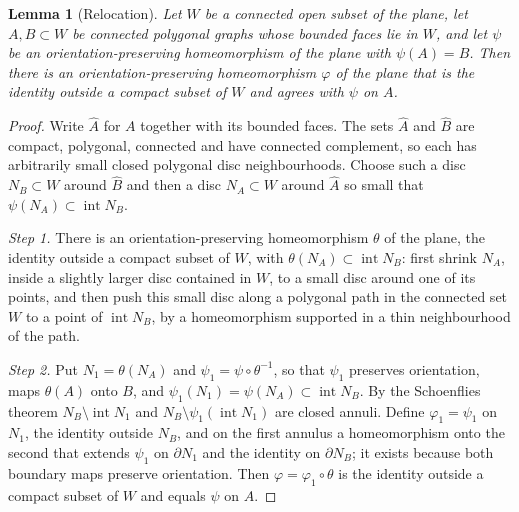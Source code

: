 \documentclass[11pt,a4paper]{article}
\newtheorem{lemma}[theorem]{Lemma}
\theoremstyle{definition}
\theoremstyle{remark}
\begin{document}
\begin{lemma}[Relocation]\label{lem:relocate}
Let $W$ be a connected open subset of the plane, let $A,B\subset W$ be
connected polygonal graphs whose bounded faces lie in $W$, and let $\psi$ be
an orientation-preserving homeomorphism of the plane with $\psi(A)=B$. Then
there is an orientation-preserving homeomorphism $\varphi$ of the plane that
is the identity outside a compact subset of $W$ and agrees with $\psi$ on $A$.
\end{lemma}
\begin{proof}
Write $\widehat{A}$ for $A$ together with its bounded faces. The sets
$\widehat{A}$ and $\widehat{B}$ are compact, polygonal, connected and have
connected complement, so each has arbitrarily small closed polygonal disc
neighbourhoods. Choose such a disc $N_B\subset W$ around $\widehat{B}$ and
then a disc $N_A\subset W$ around $\widehat{A}$ so small that
$\psi(N_A)\subset\operatorname{int}N_B$.

\emph{Step 1.} There is an orientation-preserving homeomorphism $\theta$ of
the plane, the identity outside a compact subset of $W$, with
$\theta(N_A)\subset\operatorname{int}N_B$: first shrink $N_A$, inside a
slightly larger disc contained in $W$, to a small disc around one of its
points, and then push this small disc along a polygonal path in the connected
set $W$ to a point of $\operatorname{int}N_B$, by a homeomorphism supported
in a thin neighbourhood of the path.

\emph{Step 2.} Put $N_1=\theta(N_A)$ and $\psi_1=\psi\circ\theta^{-1}$, so
that $\psi_1$ preserves orientation, maps $\theta(A)$ onto $B$, and
$\psi_1(N_1)=\psi(N_A)\subset\operatorname{int}N_B$. By the Schoenflies
theorem $N_B\setminus\operatorname{int}N_1$ and
$N_B\setminus\psi_1(\operatorname{int}N_1)$ are closed annuli. Define
$\varphi_1=\psi_1$ on $N_1$, the identity outside $N_B$, and on the first
annulus a homeomorphism onto the second that extends $\psi_1$ on
$\partial N_1$ and the identity on $\partial N_B$; it exists because both
boundary maps preserve orientation. Then $\varphi=\varphi_1\circ\theta$ is
the identity outside a compact subset of $W$ and equals $\psi$ on $A$.
\end{proof}
\end{document}
